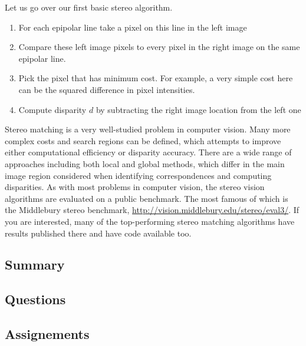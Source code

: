 Let us go over our first basic stereo algorithm.

\begin{enumerate}
\item For each epipolar line take a pixel on this line in the left image
\item Compare these left image pixels to every pixel in the right image on the same epipolar line. 
\item Pick the pixel that has minimum cost. For example, a very simple cost here can be the squared difference in pixel intensities.
\item Compute disparity $d$ by subtracting the right image location from the left one
\end{enumerate}

Stereo matching is a very well-studied problem
in computer vision. Many more complex costs and search regions can be defined, which attempts to improve either computational efficiency
or disparity accuracy. There are a wide range of approaches including both local
and global methods, which differ in the main image region considered when identifying correspondences
and computing disparities. As with most problems in computer vision, the stereo vision algorithms are evaluated 
on a public benchmark. The most famous of which is the Middlebury stereo benchmark, \url{ http://vision.middlebury.edu/stereo/eval3/}. 
If you are interested, many of the top-performing
stereo matching algorithms have results published there
and have code available too. 

\subsection{Summary}

\subsection{Questions}

\subsection{Assignements}
